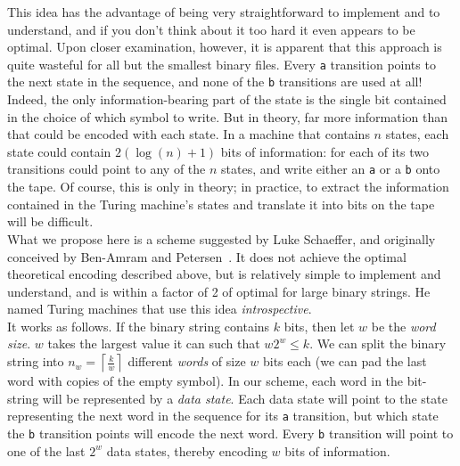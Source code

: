 \documentclass[11pt]{article}
\begin{document}
This idea has the advantage of being very straightforward to implement and to understand, and if you don't think about it too hard it even appears to be optimal. Upon closer examination, however, it is apparent that this approach is quite wasteful for all but the smallest binary files. Every \texttt{a} transition points to the next state in the sequence, and none of the \texttt{b} transitions are used at all! Indeed, the only information-bearing part of the state is the single bit contained in the choice of which symbol to write. But in theory, far more information than that could be encoded with each state. In a machine that contains $n$ states, each state could contain $2(\log(n) + 1)$ bits of information: for each of its two transitions could point to any of the $n$ states, and write either an \texttt{a} or a \texttt{b} onto the tape. Of course, this is only in theory; in practice, to extract the information contained in the Turing machine's states and translate it into bits on the tape will be difficult. \\

What we propose here is a scheme suggested by Luke Schaeffer, and originally conceived by Ben-Amram and Petersen~\cite{benamram}. It does not achieve the optimal theoretical encoding described above, but is relatively simple to implement and understand, and is within a factor of 2 of optimal for large binary strings. He named Turing machines that use this idea \emph{introspective}.  \\

It works as follows. If the binary string contains $k$ bits, then let $w$ be the \emph{word size}. $w$ takes the largest value it can such that $w2^w \le k$. We can split the binary string into $n_w = \left \lceil{\frac{k}{w}}\right \rceil$ different \emph{words} of size $w$ bits each (we can pad the last word with copies of the empty symbol). In our scheme, each word in the bit-string will be represented by a \emph{data state}. Each data state will point to the state representing the next word in the sequence for its \texttt{a} transition, but which state the \texttt{b} transition points will encode the next word. Every \texttt{b} transition will point to one of the last $2^w$ data states, thereby encoding $w$ bits of information. \\
\end{document}
